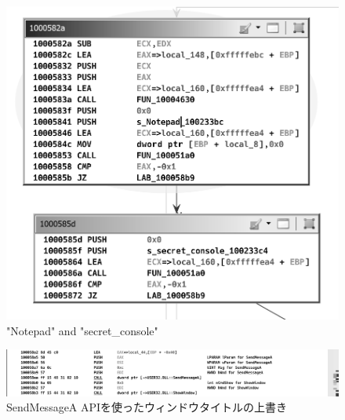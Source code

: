 \begin{figure}[H]
    \centering
    \includegraphics[width=0.5\linewidth]{./assets/takuzoo3868asset/ghidra_005_gray.png}
    \caption{"Notepad" and "secret\_console"}
    \label{fig:ghdra_005}
\end{figure}
\begin{figure}[H]
    \centering
    \includegraphics[width=\linewidth]{./assets/takuzoo3868asset/ghidra_006_gray.png}
    \caption{SendMessageA APIを使ったウィンドウタイトルの上書き}
    \label{fig:ghdra_006}
\end{figure}

